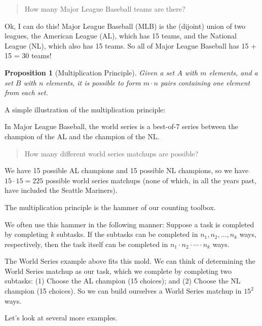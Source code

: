 \documentclass[
]{book}
\newtheorem{proposition}{Proposition}[chapter]
\theoremstyle{definition}
\theoremstyle{definition}
\theoremstyle{definition}
\theoremstyle{definition}
\theoremstyle{remark}
\begin{document}
\begin{quote}
How many Major League Baseball teams are there?
\end{quote}

Ok, I can do this! Major League Baseball (MLB) is the (dijoint) union of two leagues, the American League (AL), which has 15 teams, and the National League (NL), which also has 15 teams. So all of Major League Baseball has 15 + 15 = 30 teams!

\begin{proposition}[Multiplication Principle]
Given a set \(A\) with \(m\) elements, and a set \(B\) with \(n\) elements, it is possible to form \(m \cdot n\) pairs containing one element from each set.
\end{proposition}

A simple illustration of the multiplication principle:

In Major League Baseball, the world series is a best-of-7 series between the champion of the AL and the champion of the NL.

\begin{quote}
How many different world series matchups are possible?
\end{quote}

We have 15 possible AL champions and 15 possible NL champions, so we have \(15 \cdot 15 = 225\) possible world series matchups (none of which, in all the years past, have included the Seattle Mariners).

The multiplication principle is the hammer of our counting toolbox.

We often use this hammer in the following manner: Suppose a task is completed by completing \(k\) subtasks. If the subtasks can be completed in \(n_1, n_2, \ldots, n_k\) ways, respectively, then the task itself can be completed in \(n_1 \cdot n_2 \cdot \cdots \cdot n_k\) ways.

The World Series example above fits this mold. We can think of determining the World Series matchup as our task, which we complete by completing two subtasks: (1) Choose the AL champion (15 choices); and (2) Choose the NL champion (15 choices). So we can build ourselves a World Series matchup in \(15^2\) ways.

Let's look at several more examples.
\end{document}
